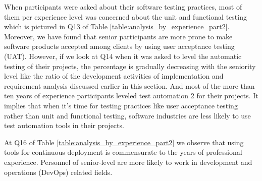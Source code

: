 When participants were asked about their software testing practices, most of them per experience level was concerned about the unit and functional testing which is pictured in Q13 of Table \ref{table:analysis_by_experience_part2}. Moreover, we have found that senior participants are more prone to make software products accepted among clients by using user acceptance testing (UAT). However, if we look at Q14 when it was asked to level the automatic testing of their projects, the percentage is gradually decreasing with the seniority level like the ratio of the development activities of implementation and requirement analysis discussed earlier in this section. And most of the more than ten years of experience participants leveled test automation 2 for their projects. It implies that when it's time for testing practices like user acceptance testing rather than unit and functional testing, software industries are less likely to use test automation tools in their projects.

At Q16 of Table \ref{table:analysis_by_experience_part2} we observe that using tools for continuous deployment is commensurate to the years of professional experience. Personnel of senior-level are more likely to work in development and operations (DevOps) related fields.